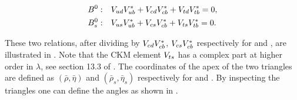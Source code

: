 \begin{subequations}
  \centering
  \label{unitConstraints}
  \begin{align}
    \Bd : & \quad \Vud\Vub^* + \Vcd\Vcb^* + \Vtd\Vtb^* = 0,
    \label{unitConstraints_Bd} \\
    \Bs : & \quad \Vus\Vub^* + \Vcs\Vcb^* + \Vts\Vtb^* = 0.
    \label{unitConstraints_Bs}
  \end{align}
\end{subequations}

\noindent These two relations, after dividing by $V_{cd}V_{cb}^*$, $V_{cs}V_{cb}^*$ respectively for \Bd and \Bs, are illustrated in .
Note that the CKM element $V_{ts}$ has a complex part at higher order in $\lambda$, see section 13.3 of \cite{PDG}.
The coordinates of the apex of the two triangles are defined as $(\bar{\rho},\bar{\eta})$ and $(\bar{\rho}_s,\bar{\eta}_s)$ respectively for  and
. By inspecting the triangles one can define the angles as shown in .

